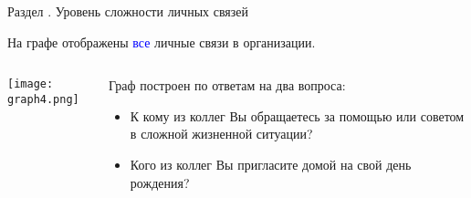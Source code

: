 \begin{frame}{Раздел . Уровень сложности личных связей}

На графе отображены \textcolor{blue}{все} личные связи в организации.

\begin{columns}[T] 
\begin{column}{0.7\textwidth} 
\centering
          \texttt{[image: graph4.png]}
\end{column}
\begin{column}{0.3\textwidth} %
\tiny
Граф построен по ответам на два вопроса:
\begin{itemize}
\item К кому из коллег Вы обращаетесь за помощью или советом в сложной жизненной ситуации?
\item Кого из коллег Вы пригласите домой на свой день рождения?
\end{itemize}
\end{column}
\end{columns}
\end{frame}


